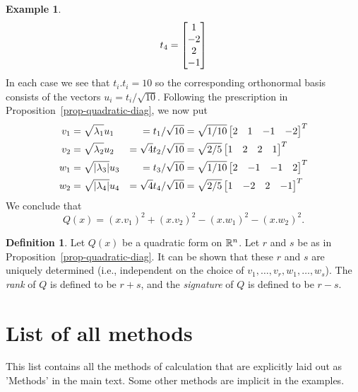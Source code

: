 \documentclass[reqno]{amsart}
\theoremstyle{definition}
\newtheorem{definition}[theorem]{Definition}
\newtheorem{example}[theorem]{Example}
\newcommand{\dfn}[1]{\emph{{#1}}\index{#1}}
\begin{document}
\begin{example}
\[    t_4 = \left[\begin{matrix}  1 \\ -2 \\  2 \\ -1 \end{matrix}\right] 
 \]
 In each case we see that $t_i.t_i=10$ so the corresponding
 orthonormal basis consists of the vectors $u_i=t_i/\sqrt{10}$.
 Following the prescription in Proposition~\ref{prop-quadratic-diag},
 we now put 
 \begin{align*}
  v_1 &= \sqrt{\lambda_1}u_1 &= t_1/\sqrt{10}
       &= \sqrt{1/10}\left[\begin{matrix} 2&1&-1&-2 \end{matrix}\right]^T \\
  v_2 &= \sqrt{\lambda_2}u_2 &= \sqrt{4}t_2/\sqrt{10}
       &= \sqrt{2/5}\left[\begin{matrix} 1&2&2&1 \end{matrix}\right]^T \\
  w_1 &= \sqrt{|\lambda_3|}u_3 &= t_3/\sqrt{10}
       &= \sqrt{1/10}\left[\begin{matrix} 2&-1&-1&2\end{matrix}\right]^T \\
  w_2 &= \sqrt{|\lambda_4|}u_4 &= \sqrt{4}t_4/\sqrt{10}
       &= \sqrt{2/5}\left[\begin{matrix} 1&-2&2&-1\end{matrix}\right]^T
 \end{align*}
 We conclude that 
 \[ Q(x) = (x.v_1)^2 + (x.v_2)^2 - (x.w_1)^2 - (x.w_2)^2. \]
\end{example}

\begin{definition}
 Let $Q(x)$ be a quadratic form on ${\mathbb{R}}^n$.  Let $r$ and $s$
 be as in Proposition~\ref{prop-quadratic-diag}.
 It can be shown that these $r$ and $s$ are uniquely
 determined (i.e., independent on the choice of
 $v_1,\dotsc,v_r,w_1,\dotsc,w_s$).
 The \dfn{rank} of $Q$ is defined
 to be $r+s$, and the \dfn{signature}
 of $Q$ is defined to be $r-s$.
\end{definition}

\appendix

\section{List of all methods}
\label{apx-methods}

This list contains all the methods of calculation that are explicitly
laid out as 'Methods' in the main text.  Some other methods are
implicit in the examples.
\end{document}
